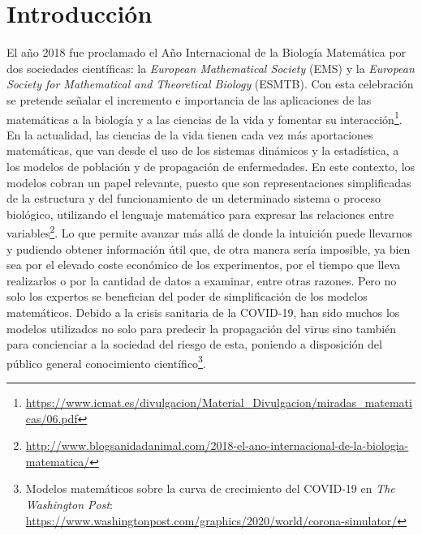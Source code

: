 \chapter{Introducción}
\label{cap:introduccion}


El año 2018 fue proclamado el Año Internacional de la Biología Matemática por dos sociedades científicas: la \textit{European Mathematical Society} (EMS) y la \textit{European Society for Mathematical and Theoretical Biology} (ESMTB). Con esta celebración se pretende señalar el incremento e importancia de las aplicaciones de las matemáticas a la biología y a las ciencias de la vida y fomentar su interacción\footnote{\url{https://www.icmat.es/divulgacion/Material_Divulgacion/miradas_matematicas/06.pdf}}. En la actualidad, las ciencias de la vida tienen cada vez más aportaciones matemáticas, que van desde el uso de los sistemas dinámicos y la estadística, a los modelos de población y de propagación de enfermedades. En este contexto, los modelos cobran un papel relevante, puesto que son representaciones simplificadas de la estructura y del funcionamiento de un determinado sistema o proceso biológico, utilizando el lenguaje matemático para expresar las relaciones entre variables\footnote{\url{http://www.blogsanidadanimal.com/2018-el-ano-internacional-de-la-biologia-matematica/}}. Lo que permite avanzar más allá de donde la intuición puede llevarnos y pudiendo obtener información útil que, de otra manera sería imposible, ya bien sea por el elevado coste económico de los experimentos, por el tiempo que lleva realizarlos o por la cantidad de datos a examinar, entre otras razones. Pero no solo los expertos se benefician del poder de simplificación de los modelos matemáticos. Debido a la crisis sanitaria de la COVID-19, han sido muchos los modelos utilizados no solo para predecir la propagación del virus sino también para concienciar a la sociedad del riesgo de esta, poniendo a disposición del público general conocimiento científico\footnote{Modelos matemáticos sobre la curva de crecimiento del COVID-19 en \textit{The Washington Post}: \url{https://www.washingtonpost.com/graphics/2020/world/corona-simulator/}}. 


